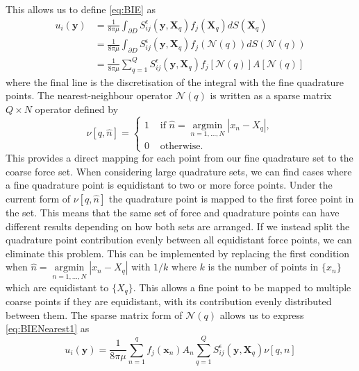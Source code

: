 This allows us to define \cref{eq:BIE} as 
\begin{equation}
\begin{aligned}
\label{eq:BIENearest1}
        u_i(\bm{y}) &= \frac{1}{8 \pi \mu} \int_{\partial D} S_{i j}^{\epsilon}\left(\bm{y}, \bm{X}_q\right) f_{j}(\bm{X}_q) d S(\bm{X}_q) \\
        &= \frac{1}{8 \pi \mu} \int_{\partial D} S_{i j}^{\epsilon}\left(\bm{y}, \bm{X}_q\right) f_{j}(\mathcal{N}(q)) d S(\mathcal{N}(q)) \\
        & = \frac{1}{8 \pi \mu} \sum_{q=1}^Q S_{i j}^{\epsilon}\left(\bm{y}, \bm{X}_q\right){f_{j}}[\mathcal{N}(q)]A[\mathcal{N}(q)]
\end{aligned}
\end{equation}
where the final line is the discretisation of the integral with the fine quadrature points. The nearest-neighbour operator $\mathcal{N}(q)$ is written as a sparse matrix $Q \times N$ operator defined by
\begin{equation}
\label{eq:NNMatrix}
    \nu [q, \hat{n}]= \begin{cases} 1 & \text { if } \hat{n}=\underset{n=1, \ldots, N}{\operatorname{argmin}}|x_n-X_q| , \\ 0 & \text { otherwise. }\end{cases}
\end{equation}
This provides a direct mapping for each point from our fine quadrature set to the coarse force set. When considering large quadrature sets, we can find cases where a fine quadrature point is equidistant to two or more force points. Under the current form of $\nu [q, \hat{n}]$ the quadrature point is mapped to the first force point in the set. This means that the same set of force and quadrature points can have different results depending on how both sets are arranged. If we instead split the quadrature point contribution evenly between all equidistant force points, we can eliminate this problem. This can be implemented by replacing the first condition when $\hat{n}=\underset{n=1, \ldots, N}{\operatorname{argmin}}|x_n-X_q|$ with $1/k$ where $k$ is the number of points in $\{x_n\}$ which are equidistant to $\{X_q\}$. This allows a fine point to be mapped to multiple coarse points if they are equidistant, with its contribution evenly distributed between them. The sparse matrix form of $\mathcal{N}(q)$ allows us to express \cref{eq:BIENearest1} as 
\begin{equation}
    u_i(\bm{y}) = \frac{1}{8 \pi \mu} \sum_{n=1}^q  f_{j}(\bm{x}_n) A_n \sum_{q=1}^{Q}S_{i j}^{\epsilon}\left(\bm{y}, \bm{X}_q\right) \nu[q,n]
\end{equation}
